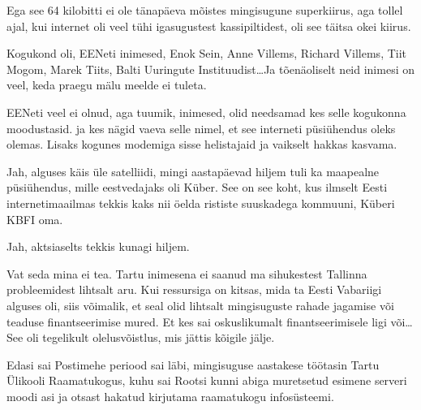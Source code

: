 Ega see 64 kilobitti ei ole tänapäeva mõistes mingisugune superkiirus, aga 
tollel ajal, kui internet oli veel tühi igasugustest kassipiltidest, oli see 
täitsa okei kiirus.


Kogukond oli,  EENeti inimesed, Enok Sein, 
Anne Villems, Richard Villems, 
Tiit Mogom, Marek Tiits, Balti Uuringute Instituudist\ldots	 Ja tõenäoliselt neid inimesi 
on veel, keda praegu mälu meelde ei tuleta.


EENeti veel ei olnud, aga tuumik, inimesed, olid needsamad kes  selle kogukonna 
moodustasid. ja kes nägid vaeva selle nimel, et see interneti püsiühendus oleks 
olemas. Lisaks kogunes  modemiga sisse helistajaid ja vaikselt hakkas kasvama.


Jah, alguses käis üle satelliidi, mingi aastapäevad hiljem tuli ka maapealne 
püsiühendus, mille  eestvedajaks oli Küber. See on see koht, kus 
ilmselt Eesti internetimaailmas tekkis kaks nii öelda rististe suuskadega 
kommuuni, Küberi  KBFI oma.


Jah, aktsiaselts tekkis  kunagi hiljem.


Vat seda mina ei tea. Tartu inimesena ei saanud ma sihukestest Tallinna 
probleemidest  lihtsalt aru. Kui ressursiga on kitsas, mida ta Eesti Vabariigi 
alguses oli, siis võimalik, et seal olid lihtsalt mingisuguste rahade jagamise 
või teaduse finantseerimise mured. Et kes sai oskuslikumalt finantseerimisele 
ligi või\dots See oli tegelikult olelusvõistlus, mis jättis kõigile jälje.


Edasi sai Postimehe periood sai läbi, mingisuguse aastakese töötasin Tartu 
Ülikooli Raamatukogus, kuhu sai Rootsi kunni 
abiga muretsetud esimene serveri moodi asi ja otsast hakatud kirjutama 
raamatukogu infosüsteemi.

